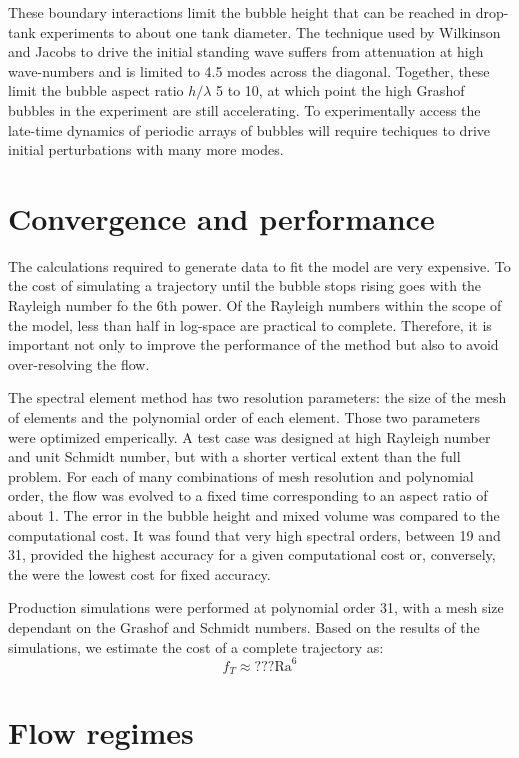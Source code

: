 These boundary interactions limit the bubble height that can be reached in drop-tank experiments to about one tank diameter.
The technique used by Wilkinson and Jacobs to drive the initial standing wave suffers from attenuation at high wave-numbers and is limited to 4.5 modes across the diagonal.
Together, these limit the bubble aspect ratio $h/\lambda$ 5 to 10, at which point the high Grashof bubbles in the experiment are still accelerating.
To experimentally access the late-time dynamics of periodic arrays of bubbles will require techiques to drive initial perturbations with many more modes.

\section{Convergence and performance}

The calculations required to generate data to fit the model are very expensive.
To the cost of simulating a trajectory until the bubble stops rising goes with the Rayleigh number fo the 6th power.
Of the Rayleigh numbers within the scope of the model, less than half in log-space are practical to complete.
Therefore, it is important not only to improve the performance of the method but also to avoid over-resolving the flow.

The spectral element method has two resolution parameters: the size of the mesh of elements and the polynomial order of each element.
Those two parameters were optimized emperically.
A test case was designed at high Rayleigh number and unit Schmidt number, but with a shorter vertical extent than the full problem.
For each of many combinations of mesh resolution and polynomial order, the flow was evolved to a fixed time corresponding to an aspect ratio of  about 1.
The error in the bubble height and mixed volume was compared to the computational cost.
It was found that very high spectral orders, between 19 and 31, provided the highest accuracy for a given computational cost or, conversely, the were the lowest cost for fixed accuracy.

Production simulations were performed at polynomial order 31, with a mesh size dependant on the Grashof and Schmidt numbers.
Based on the results of the simulations, we estimate the cost of a complete trajectory as:
\begin{equation}
f_T \approx ??? \text{Ra}^6
\end{equation}

\section{Flow regimes}

